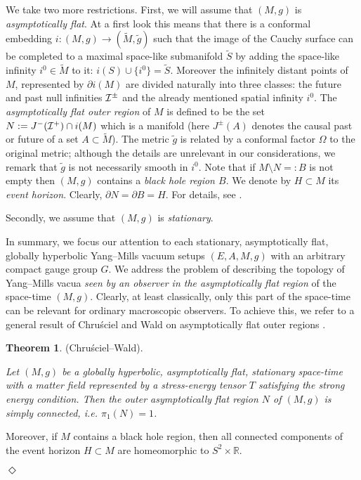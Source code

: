 \documentclass[a4paper,12pt,draft]{article}
\newcommand{\R}{{\mathbb R}}
\begin{document}
We take two more restrictions. First, we will assume that $(M, g)$ is {\it
asymptotically flat}. At a first look this means that there is
a conformal embedding $i: (M, g)\rightarrow (\widetilde{M},\widetilde{g})$
such that the image of the Cauchy surface can be
completed to a maximal space-like submanifold $\widetilde{S}$ by adding
the space-like infinity $i^0\in\widetilde{M}$ to it: $i(S)\cup\{ i^0\}
=\widetilde{S}$. Moreover
the infinitely distant points of $M$, represented by $\partial i(M)$ are
divided naturally into three classes: the future and past null infinities
${\cal I}^\pm$ and the already mentioned spatial infinity $i^0$. The {\it
asymptotically flat outer region} of $M$ is defined to be the set
$N:=J^-({\cal I}^+)\cap i(M)$ which is a manifold (here $J^\pm (A)$
denotes the causal past or future of a set $A\subset\widetilde{M}$). The 
metric $\widetilde{g}$ is related by a conformal factor $\Omega$ to
the original metric; although the details are unrelevant in our 
considerations, we remark that $\widetilde{g}$ is not necessarily smooth
in $i^0$. Note that if $M\setminus N=:B$ is not empty then $(M, g)$
contains a {\it black hole region $B$}. We denote by $H\subset M$
its {\it event horizon}. Clearly, $\partial N = \partial B=H$. For
details, see \cite{wal}.

Secondly, we assume that $(M, g)$ is {\it stationary}.

In summary, we focus our attention to each stationary, asymptotically 
flat, globally hyperbolic Yang--Mills vacuum setups $(E, A, M,
g)$ with an arbitrary compact gauge group $G$. We address the problem of
describing the topology of Yang--Mills vacua {\it seen by an observer in
the asymptotically flat region} of the space-time $(M,g)$. Clearly, at
least classically, only this part of the space-time can be relevant for
ordinary macroscopic observers. To achieve this, we refer to a general 
result of Chru\'sciel and Wald on asymptotically flat outer regions
\cite{chr-wal}.
\vspace{0.1in}

{\bf Theorem 1}. (Chru\'sciel--Wald). {\it Let $(M, g)$ be a globally
hyperbolic, asymptotically flat, stationary space-time with a matter field
represented by a stress-energy tensor $T$ satisfying the strong
energy condition. Then the outer asymptotically flat
region $N$ of $(M,g)$ is simply connected, i.e. $\pi_1(N)=1$.

Moreover, if $M$ contains a black hole region, then all connected
components of the event horizon $H\subset M$ are homeomorphic to
$S^2\times\R$.} $\Diamond$
\vspace{0.1in}
\end{document}
